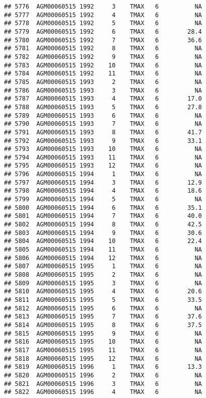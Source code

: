 \documentclass{article}\usepackage[]{graphicx}\usepackage[]{color}
\makeatletter
\newenvironment{kframe}{%
 \def\at@end@of@kframe{}%
 \ifinner\ifhmode%
  \def\at@end@of@kframe{\end{minipage}}%
  \begin{minipage}{\columnwidth}%
 \fi\fi%
 \def\FrameCommand##1{\hskip\@totalleftmargin \hskip-\fboxsep
 \colorbox{shadecolor}{##1}\hskip-\fboxsep
     \hskip-\linewidth \hskip-\@totalleftmargin \hskip\columnwidth}%
 \MakeFramed {\advance\hsize-\width
   \@totalleftmargin\z@ \linewidth\hsize
   \@setminipage}}%
 {\par\unskip\endMakeFramed%
 \at@end@of@kframe}
\newenvironment{knitrout}{}{} %
\makeatother
\begin{document}
\begin{knitrout}
\begin{kframe}
\begin{verbatim}
## 5776  AGM00060515 1992     3    TMAX   6          NA
## 5777  AGM00060515 1992     4    TMAX   6          NA
## 5778  AGM00060515 1992     5    TMAX   6          NA
## 5779  AGM00060515 1992     6    TMAX   6        28.4
## 5780  AGM00060515 1992     7    TMAX   6        36.6
## 5781  AGM00060515 1992     8    TMAX   6          NA
## 5782  AGM00060515 1992     9    TMAX   6          NA
## 5783  AGM00060515 1992    10    TMAX   6          NA
## 5784  AGM00060515 1992    11    TMAX   6          NA
## 5785  AGM00060515 1993     2    TMAX   6          NA
## 5786  AGM00060515 1993     3    TMAX   6          NA
## 5787  AGM00060515 1993     4    TMAX   6        17.0
## 5788  AGM00060515 1993     5    TMAX   6        27.8
## 5789  AGM00060515 1993     6    TMAX   6          NA
## 5790  AGM00060515 1993     7    TMAX   6          NA
## 5791  AGM00060515 1993     8    TMAX   6        41.7
## 5792  AGM00060515 1993     9    TMAX   6        33.1
## 5793  AGM00060515 1993    10    TMAX   6          NA
## 5794  AGM00060515 1993    11    TMAX   6          NA
## 5795  AGM00060515 1993    12    TMAX   6          NA
## 5796  AGM00060515 1994     1    TMAX   6          NA
## 5797  AGM00060515 1994     3    TMAX   6        12.9
## 5798  AGM00060515 1994     4    TMAX   6        18.6
## 5799  AGM00060515 1994     5    TMAX   6          NA
## 5800  AGM00060515 1994     6    TMAX   6        35.1
## 5801  AGM00060515 1994     7    TMAX   6        40.0
## 5802  AGM00060515 1994     8    TMAX   6        42.5
## 5803  AGM00060515 1994     9    TMAX   6        30.6
## 5804  AGM00060515 1994    10    TMAX   6        22.4
## 5805  AGM00060515 1994    11    TMAX   6          NA
## 5806  AGM00060515 1994    12    TMAX   6          NA
## 5807  AGM00060515 1995     1    TMAX   6          NA
## 5808  AGM00060515 1995     2    TMAX   6          NA
## 5809  AGM00060515 1995     3    TMAX   6          NA
## 5810  AGM00060515 1995     4    TMAX   6        20.6
## 5811  AGM00060515 1995     5    TMAX   6        33.5
## 5812  AGM00060515 1995     6    TMAX   6          NA
## 5813  AGM00060515 1995     7    TMAX   6        37.6
## 5814  AGM00060515 1995     8    TMAX   6        37.5
## 5815  AGM00060515 1995     9    TMAX   6          NA
## 5816  AGM00060515 1995    10    TMAX   6          NA
## 5817  AGM00060515 1995    11    TMAX   6          NA
## 5818  AGM00060515 1995    12    TMAX   6          NA
## 5819  AGM00060515 1996     1    TMAX   6        13.3
## 5820  AGM00060515 1996     2    TMAX   6          NA
## 5821  AGM00060515 1996     3    TMAX   6          NA
## 5822  AGM00060515 1996     4    TMAX   6          NA

\end{verbatim}
\end{kframe}
\end{knitrout}
\end{document}
